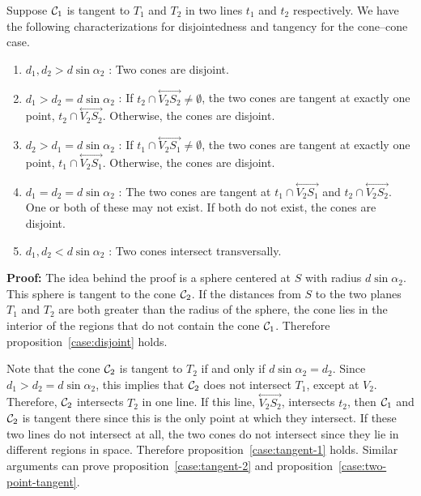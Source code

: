 \begin{theorem}
\label{theorem:tangent-disjoint}
     Suppose ${\cal C}_1$ is tangent to $T_1$ and $T_2$ in two lines $t_1$ and
$t_2$ respectively.  We have the following characterizations for 
disjointedness and tangency for the cone--cone case.
\begin{enumerate}
     \item\label{case:disjoint} $d_1, d_2>d\sin\alpha_2$ : Two cones are 
          disjoint.
     \item\label{case:tangent-1} $d_1>d_2=d\sin\alpha_2$  : If $t_2\cap
          \stackrel{\longleftrightarrow}{V_2S_2}\neq\emptyset$, the two 
          cones are tangent at exactly one point, 
          $t_2\cap\stackrel{\longleftrightarrow}{V_2S_2}$.  
          Otherwise, the cones are disjoint.
     \item\label{case:tangent-2} $d_2>d_1=d\sin\alpha_2$  : If $t_1\cap
          \stackrel{\longleftrightarrow}{V_2S_1}\neq\emptyset$, the two 
          cones are tangent at exactly one point,
          $t_1\cap\stackrel{\longleftrightarrow}{V_2S_1}$.  
          Otherwise, the cones are disjoint.
     \item\label{case:two-point-tangent} $d_1=d_2=d\sin\alpha_2$ :  The two 
          cones are tangent at $t_1\cap\stackrel{\longleftrightarrow}{V_2S_1}$
          and $t_2\cap\stackrel{\longleftrightarrow}{V_2S_2}$.  One or both of
          these may not exist.  If both do not exist, the cones are disjoint.
     \item\label{case:intersect} $d_1,d_2< d\sin\alpha_2$ :
          Two cones intersect transversally.
\end{enumerate}
\end{theorem}
{\bf Proof:} The idea behind the proof is a sphere centered at $S$ with radius
$d\sin\alpha_2$.  This sphere is tangent to the cone ${\cal C}_2$.  If the
distances from $S$ to the two planes $T_1$ and $T_2$ are both greater than the
radius of the sphere, the cone lies in the interior of the regions that do not
contain the cone ${\cal C}_1$. Therefore proposition~\ref{case:disjoint} holds.

     Note that the cone ${\cal C}_2$ is tangent to $T_2$ if and only if 
$d\sin\alpha_2=d_2$.  Since $d_1>d_2=d\sin\alpha_2$, this implies that 
${\cal C}_2$ does not intersect $T_1$, except at $V_2$.  Therefore, 
${\cal C}_2$ intersects $T_2$ in one line.  If this line, 
$\stackrel{\longleftrightarrow}{V_2S_2}$, intersects $t_2$, then ${\cal C}_1$ 
and ${\cal C}_2$ is tangent there since this is the only point at which they
intersect.  If these two lines do not intersect at all, the two cones do not 
intersect since they lie in different regions in space.  Therefore 
proposition~\ref{case:tangent-1} holds.  Similar arguments can prove 
proposition~\ref{case:tangent-2} and proposition~\ref{case:two-point-tangent}.

